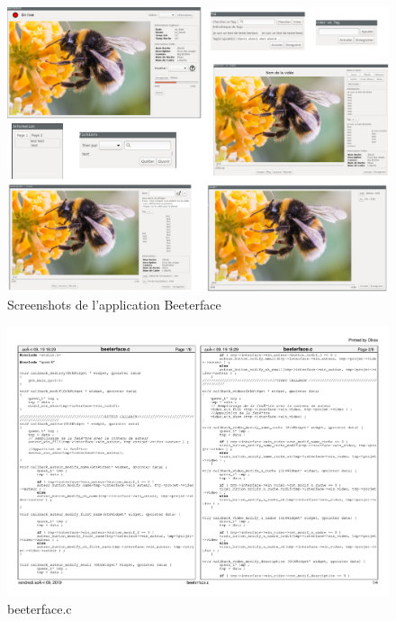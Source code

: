 \documentclass[11pt,french,a4paper]{report}
\begin{document}
\begin{landscape}
    \begin{figure}[h]
    \centering
    \includegraphics[scale=0.6]{../images/annexes/screen_appli.png}
    \caption{Screenshots de l'application Beeterface}
    \label{an2}
\end{figure}
\begin{figure}[h]
    \centering
    \includegraphics[page=1,scale=0.8]{../code/beeterface.pdf}
    \caption{beeterface.c}
    \label{an3}
\end{figure}


\end{landscape}
\end{document}
